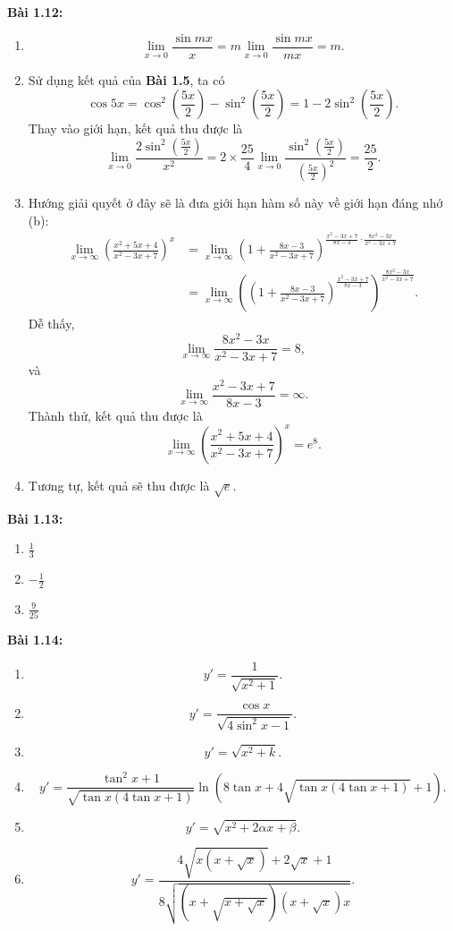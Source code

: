 \textbf{Bài 1.12:}
\begin{enumerate}[label=(\alph*)]
\item \[\lim_{x\rightarrow 0}\frac{\sin mx}{x}=m\lim_{x\rightarrow 0}\frac{\sin mx}{mx}=m.\]
\item Sử dụng kết quả của \textbf{Bài 1.5}, ta có \[\cos 5x =\cos^2 \left(\frac{5x}{2}\right)-\sin^2\left(\frac{5x}{2}\right)=1-2\sin^2\left(\frac{5x}{2}\right).\] Thay vào giới hạn, kết quả thu được là \[\lim_{x\rightarrow 0}\frac{2\sin^2\left(\frac{5x}{2}\right)}{x^2}=2\times\frac{25}{4}\lim_{x\rightarrow 0}\frac{\sin^2 \left(\frac{5x}{2}\right)}{\left(\frac{5x}{2}\right)^2}=\frac{25}{2}.\]
\item Hướng giải quyết ở đây sẽ là đưa giới hạn hàm số này về giới hạn đáng nhớ (b): 
\begin{align*}
    \lim_{x\rightarrow\infty}\left(\frac{x^2+5x+4}{x^2-3x+7}\right)^x&=\lim_{x\rightarrow\infty}\left(1+\frac{8x-3}{x^2 -3x+7}\right)^{\frac{x^2-3x+7}{8x-3}\cdot\frac{8x^2-3x}{x^2-3x+7}}\\ &=
\lim_{x\rightarrow\infty}\left(\left(1+\frac{8x-3}{x^2 -3x+7}\right)^{\frac{x^2-3x+7}{8x-3}}\right)^{\frac{8x^2-3x}{x^2-3x+7}}.
\end{align*}
 Dễ thấy, \[\lim_{x\rightarrow\infty}\frac{8x^2-3x}{x^2-3x+7}=8,\] và \[\lim_{x\rightarrow\infty}\frac{x^2-3x+7}{8x-3}=\infty.\] Thành thử, kết quả thu được là \[\lim_{x\rightarrow\infty}\left(\frac{x^2+5x+4}{x^2-3x+7}\right)^x=e^8.\] 
\item Tương tự, kết quả sẽ thu được là \(\sqrt{e}\).
\end{enumerate}
\vspace{5pt}

\textbf{Bài 1.13:}  
\begin{enumerate}[label=(\alph*)]   
    \item \(\frac{1}{3}\)
    \item \(-\frac{1}{2}\)
    \item \(\frac{9}{25}\)
\end{enumerate}
\vspace{5pt}

\textbf{Bài 1.14:}
\begin{enumerate}[label=(\alph*)]
\item \[y' =\frac{1}{\sqrt{x^2+1}}.\]
\item \[y'= \frac{\cos x}{\sqrt{4\sin^2 x -1}}.\]
\item \[y'= \sqrt{x^2+k}.\]
\item \[y'=\frac{\tan^2 x+1}{\sqrt{\tan x (4\tan x +1)}}\ln \left(8\tan x +4\sqrt{\tan x (4\tan x +1)}+1\right).\]
\item \[y'=\sqrt{x^2 +2\alpha x +\beta}.\]
\item \[y'=\frac{4\sqrt{x\left(x+\sqrt{x}\right)}+2\sqrt{x}+1}{8\sqrt{\left(x+\sqrt{x+\sqrt{x}}\right)(x+\sqrt{x})x}}.\]
\end{enumerate}  